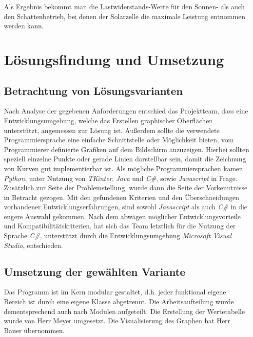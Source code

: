 \documentclass[a4paper]{article}
\begin{document}
    Als Ergebnis bekommt man die Lastwiderstands-Werte für den Sonnen- als auch den Schattenbetrieb, bei denen der Solarzelle die maximale Leistung entnommen werden kann.

\newpage
\section{Lösungsfindung und Umsetzung}

\subsection{Betrachtung von Lösungsvarianten}

    Nach Analyse der gegebenen Anforderungen entschied das Projektteam, dass eine Entwicklungsumgebung, welche das Erstellen graphischer Oberflächen unterstützt, angemessen zur Lösung ist.
    Außerdem sollte die verwendete Programmiersprache eine einfache Schnittstelle oder Möglichkeit bieten, vom Programmierer definierte Grafiken auf dem Bildschirm anzuzeigen.
    Hierbei sollten speziell einzelne Punkte oder gerade Linien darstellbar sein, damit die Zeichnung von Kurven gut implementierbar ist.
    Als mögliche Programmiersprachen kamen \textit{\glqq Python\grqq{}}, unter Nutzung von \textit{\glqq TKinter\grqq{}}, \textit{\glqq Java\grqq{}} und \textit{\glqq C\#\grqq{}}, sowie \textit{\glqq Javascript\grqq{}} in Frage.
    Zusätzlich zur Seite der Problemstellung, wurde dann die Seite der Vorkenntnisse in Betracht gezogen.
    Mit den gefundenen Kriterien und den Überschneidungen vorhandener Entwicklungserfahrungen, sind sowohl \textit{\glqq Javascript\grqq{}} als auch \textit{\glqq C\#\grqq{}} in die engere Auswahl gekommen.
    Nach dem abwägen möglicher Entwicklungsvorteile und Kompatibilitätskriterien, hat sich das Team letztlich für die Nutzung der Sprache \textit{\glqq C\#\grqq{}}, unterstützt durch die Entwicklungsumgebung \textit{\glqq Microsoft Visual Studio\grqq{}}, entschieden.

\subsection{Umsetzung der gewählten Variante}

    Das Programm ist im Kern modular gestaltet, d.h. jeder funktional eigene Bereich ist durch eine eigene Klasse abgetrennt.
    Die Arbeitsaufteilung wurde dementsprechend auch nach Modulen aufgeteilt.
    Die Erstellung der Wertetabelle wurde von Herr Meyer umgesetzt.
    Die Visualisierung des Graphen hat Herr Bauer übernommen.
\end{document}
